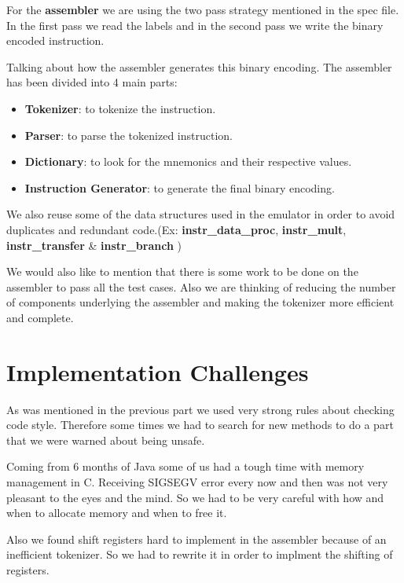 \documentclass[11pt]{article}
\begin{document}
For the \textbf{assembler} we are using the two pass strategy mentioned in the
spec file. In the first pass we read the labels and in the second pass we write
the binary encoded instruction.

Talking about how the assembler generates this binary encoding. The assembler
has been divided into 4 main parts:
\begin{itemize}[noitemsep,topsep=0pt]
	\item \textbf{Tokenizer}:
		to tokenize the instruction.
	\item \textbf{Parser}:
		to parse the tokenized instruction.
	\item \textbf{Dictionary}:
		to look for the mnemonics and their respective values.
	\item \textbf{Instruction Generator}:
		to generate the final binary encoding.
\end{itemize}

We also reuse some of the data structures used in the emulator in order to
avoid duplicates and redundant code.(Ex:
\textbf{instr\_data\_proc}, \textbf{instr\_mult}, \textbf{instr\_transfer} \& \textbf{instr\_branch}
)

We would also like to mention that there is some work to be done on the
assembler to pass all the test cases. Also we are thinking of reducing the
number of components underlying the assembler and making the tokenizer more
efficient and complete.

\section{Implementation Challenges}

As was mentioned in the previous part we used very strong rules about checking
code style. Therefore some times we had to search for new methods to do a part
that we were warned about being unsafe.

Coming from 6 months of Java some of us had a tough time with memory management
in C. Receiving SIGSEGV error every now and then was not very pleasant to the
eyes and the mind. So we had to be very careful with how and when to allocate
memory and when to free it.

Also we found shift registers hard to implement in the assembler because of an
inefficient tokenizer. So we had to rewrite it in order to implment the
shifting of registers.
\end{document}
